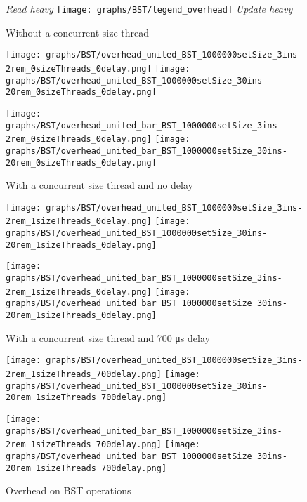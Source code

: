 \documentclass{article}
\begin{document}
\begin{figure*}[htbp]
	\centering
	\medskip
	\textit{Read heavy}\quad\quad
	\texttt{[image: graphs/BST/legend\_overhead]}\quad\quad
	\textit{Update heavy}\par
	\medskip
	Without a concurrent size thread\par
        \smallskip
	\texttt{[image: graphs/BST/overhead\_united\_BST\_1000000setSize\_3ins-2rem\_0sizeThreads\_0delay.png]}\hspace{2.5em}
	\texttt{[image: graphs/BST/overhead\_united\_BST\_1000000setSize\_30ins-20rem\_0sizeThreads\_0delay.png]}\par
	\texttt{[image: graphs/BST/overhead\_united\_bar\_BST\_1000000setSize\_3ins-2rem\_0sizeThreads\_0delay.png]}\hspace{2.5em}
	\texttt{[image: graphs/BST/overhead\_united\_bar\_BST\_1000000setSize\_30ins-20rem\_0sizeThreads\_0delay.png]}\par
	\medskip
	With a concurrent size thread and no delay\par
	\texttt{[image: graphs/BST/overhead\_united\_BST\_1000000setSize\_3ins-2rem\_1sizeThreads\_0delay.png]}\hspace{2.5em}
	\texttt{[image: graphs/BST/overhead\_united\_BST\_1000000setSize\_30ins-20rem\_1sizeThreads\_0delay.png]}\par
	\texttt{[image: graphs/BST/overhead\_united\_bar\_BST\_1000000setSize\_3ins-2rem\_1sizeThreads\_0delay.png]}\hspace{2.5em}
	\texttt{[image: graphs/BST/overhead\_united\_bar\_BST\_1000000setSize\_30ins-20rem\_1sizeThreads\_0delay.png]}\par
	\medskip
	With a concurrent size thread and 700 \si{\micro\second} delay\par
	\texttt{[image: graphs/BST/overhead\_united\_BST\_1000000setSize\_3ins-2rem\_1sizeThreads\_700delay.png]}\hspace{2.5em}
	\texttt{[image: graphs/BST/overhead\_united\_BST\_1000000setSize\_30ins-20rem\_1sizeThreads\_700delay.png]}\par
	\texttt{[image: graphs/BST/overhead\_united\_bar\_BST\_1000000setSize\_3ins-2rem\_1sizeThreads\_700delay.png]}\hspace{2.5em}
	\texttt{[image: graphs/BST/overhead\_united\_bar\_BST\_1000000setSize\_30ins-20rem\_1sizeThreads\_700delay.png]}\par
	\caption{Overhead on BST operations}
	\label{fig:BST overhead}
\end{figure*}
\end{document}
